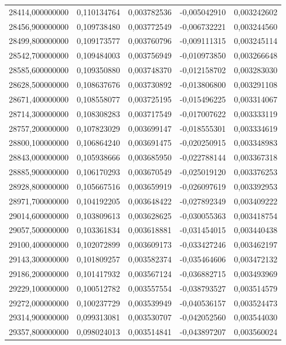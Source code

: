 \begin{longtable}{rrrrr}
28414,000000000 & 0,110134764 & 0,003782536 & -0,005042910 & 0,003242602\\
28456,900000000 & 0,109738480 & 0,003772549 & -0,006732221 & 0,003244560\\
28499,800000000 & 0,109173577 & 0,003760796 & -0,009111315 & 0,003245114\\
28542,700000000 & 0,109484003 & 0,003756949 & -0,010973850 & 0,003266648\\
28585,600000000 & 0,109350880 & 0,003748370 & -0,012158702 & 0,003283030\\
28628,500000000 & 0,108637676 & 0,003730892 & -0,013806800 & 0,003291108\\
28671,400000000 & 0,108558077 & 0,003725195 & -0,015496225 & 0,003314067\\
28714,300000000 & 0,108308283 & 0,003717549 & -0,017007622 & 0,003333119\\
28757,200000000 & 0,107823029 & 0,003699147 & -0,018555301 & 0,003334619\\
28800,100000000 & 0,106864240 & 0,003691475 & -0,020250915 & 0,003348983\\
28843,000000000 & 0,105938666 & 0,003685950 & -0,022788144 & 0,003367318\\
28885,900000000 & 0,106170293 & 0,003670549 & -0,025019120 & 0,003376253\\
28928,800000000 & 0,105667516 & 0,003659919 & -0,026097619 & 0,003392953\\
28971,700000000 & 0,104192205 & 0,003648422 & -0,027892349 & 0,003409222\\
29014,600000000 & 0,103809613 & 0,003628625 & -0,030055363 & 0,003418754\\
29057,500000000 & 0,103361834 & 0,003618881 & -0,031454015 & 0,003440438\\
29100,400000000 & 0,102072899 & 0,003609173 & -0,033427246 & 0,003462197\\
29143,300000000 & 0,101809257 & 0,003582374 & -0,035464606 & 0,003472132\\
29186,200000000 & 0,101417932 & 0,003567124 & -0,036882715 & 0,003493969\\
29229,100000000 & 0,100512782 & 0,003557554 & -0,038793527 & 0,003514579\\
29272,000000000 & 0,100237729 & 0,003539949 & -0,040536157 & 0,003524473\\
29314,900000000 & 0,099313081 & 0,003530707 & -0,042052560 & 0,003544030\\
29357,800000000 & 0,098024013 & 0,003514841 & -0,043897207 & 0,003560024\\

\end{longtable}
